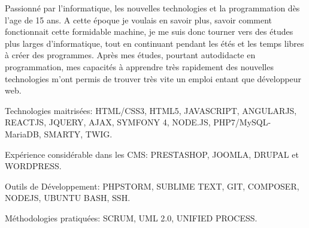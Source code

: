 {\textcolor{awesome}{\color{graytext}}  {Passionné par l'informatique, les nouvelles technologies et la programmation dès l'age de 15 ans. A cette époque je voulais en savoir plus, savoir comment fonctionnait cette formidable machine, je me suis donc tourner vers des études plus larges d'informatique, tout en continuant pendant les étés et les temps libres à créer des programmes. Après mes études, pourtant autodidacte en programmation, mes capacités à apprendre très rapidement des nouvelles technologies m'ont permis de trouver très vite un emploi entant que développeur web.}}

\begin{cventries}
  \cventry
    {}
    {}
    {}
    {}
    {
      \begin{cvitems}
        \item {Technologies maitrisées: HTML/CSS3, HTML5, JAVASCRIPT, ANGULARJS, REACTJS, JQUERY, AJAX, SYMFONY 4, NODE.JS, PHP7/MySQL-MariaDB, SMARTY, TWIG.}
        \item {Expérience considérable dans les CMS: PRESTASHOP, JOOMLA, DRUPAL et WORDPRESS.}
        \item {Outils de Développement: PHPSTORM, SUBLIME TEXT, GIT, COMPOSER, NODEJS, UBUNTU BASH, SSH.}
        \item {Méthodologie​s pratiquées: SCRUM, UML 2.0, UNIFIED PROCESS.}
      \end{cvitems}
    }
\end{cventries}